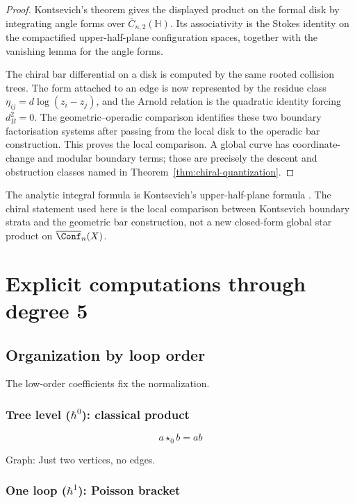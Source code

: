 \begin{proof}
Kontsevich's theorem gives the displayed product on the formal disk by
integrating angle forms over $\overline{C}_{n,2}(\mathbb H)$. Its
associativity is the Stokes identity on the compactified
upper-half-plane configuration spaces, together with the vanishing
lemma for the angle forms.

The chiral bar differential on a disk is computed by the same rooted
collision trees. The form attached to an edge is now represented by the
residue class $\eta_{ij}=d\log(z_i-z_j)$, and the Arnold relation is the
quadratic identity forcing $d_B^2=0$. The
geometric--operadic comparison identifies these two boundary
factorisation systems after passing from the local disk to the
operadic bar construction. This proves the local comparison. A global
curve has coordinate-change and modular boundary terms; those are
precisely the descent and obstruction classes named in
Theorem~\ref{thm:chiral-quantization}.
\end{proof}

\begin{remark}[Provenance]
The analytic integral formula is Kontsevich's upper-half-plane formula
\cite{Kon03}. The chiral statement used here is the local comparison
between Kontsevich boundary strata and the geometric bar construction,
not a new closed-form global star product on
$\overline{\Conf}_n(X)$.
\end{remark}

\section{Explicit computations through degree 5}

\subsection{Organization by loop order}

The low-order coefficients fix the normalization.

\subsubsection{\texorpdfstring{Tree level ($\hbar^0$): classical product}{Tree level (0): classical product}}

\[a \star_0 b = ab\]

Graph: Just two vertices, no edges.

\subsubsection{\texorpdfstring{One loop ($\hbar^1$): Poisson bracket}{One loop (1): Poisson bracket}}

